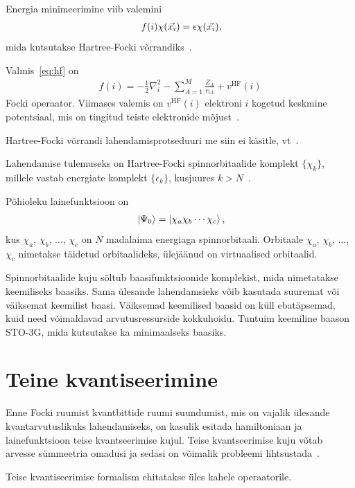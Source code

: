 \documentclass[12pt]{report}
\def\ket#1{\mathinner{|#1\rangle}}
\begin{document}
Energia minimeerimine viib valemini
\begin{align}\label{eq:hf}
    f(i) \chi(\vec{x_i}) = \epsilon \chi(\vec{x_i}) \rlap{,}
\end{align}
mida kutsutakse Hartree-Focki võrrandiks~\cite{szabo+ostlund}.

Valmis~\eqref{eq:hf} on
\begin{align}
    f(i) = -\frac{1}{2} \nabla_i^2 - \sum_{A = 1}^M \frac{Z_A}{r_{iA}} + v^\text{HF}(i)
\end{align}
Focki operaator.
Viimases valemis on \(v^\text{HF}(i)\) elektroni \(i\) kogetud keskmine potentsiaal, mis on tingitud teiste elektronide mõjust~\cite{szabo+ostlund}.

Hartree-Focki võrrandi lahendamisprotseduuri me siin ei käsitle, vt~\cite{szabo+ostlund}.

Lahendamise tulemuseks on Hartree-Focki spinnorbitaalide komplekt \(\{\chi_k\}\), millele vastab energiate komplekt \(\{\epsilon_k\}\), kusjuures \(k > N\)~\cite{szabo+ostlund}.

Põhioleku lainefunktsioon on
\begin{align}
    \ket{\Psi_0} = \ket{\chi_a \chi_b \cdots \chi_c} \rlap{,}
\end{align}
kus \(\chi_a\), \(\chi_b\), \(\ldots\), \(\chi_c\) on \(N\) madalaima energiaga spinnorbitaali.
Orbitaale \(\chi_a\), \(\chi_b\), \(\ldots\), \(\chi_c\) nimetakse täidetud orbitaalideks, ülejäänud on virtuaalised orbitaalid.

Spinnorbitaalide kuju sõltub baasifunktsioonide komplekist, mida nimetatakse keemiliseks baasiks.
Sama ülesande lahendamsieks võib kasutada suuremat või väiksemat keemilist baasi.
Väiksemad keemilised baasid on küll ebatäpsemad, kuid need võimaldavad arvutusressurside kokkuhoidu.
Tuntuim keemiline baason STO-3G, mida kutsutakse ka minimaalseks baasiks.

\section{Teine kvantiseerimine}\label{sec:secquant}

Enne Focki ruumist kvantbittide ruumi suundumist, mis on vajalik ülesande kvantarvutuslikuks lahendamiseks, on kasulik esitada hamiltoniaan ja lainefunktsioon teise kvantseerimise kujul.
Teise kvantseerimise kuju võtab arvesse sümmeetria omadusi ja sedasi on võimalik probleemi lihtsustada~\cite{kassal+etal, yung+etal}.

Teise kvantiseerimise formalism ehitatakse üles kahele operaatorile.
\end{document}
